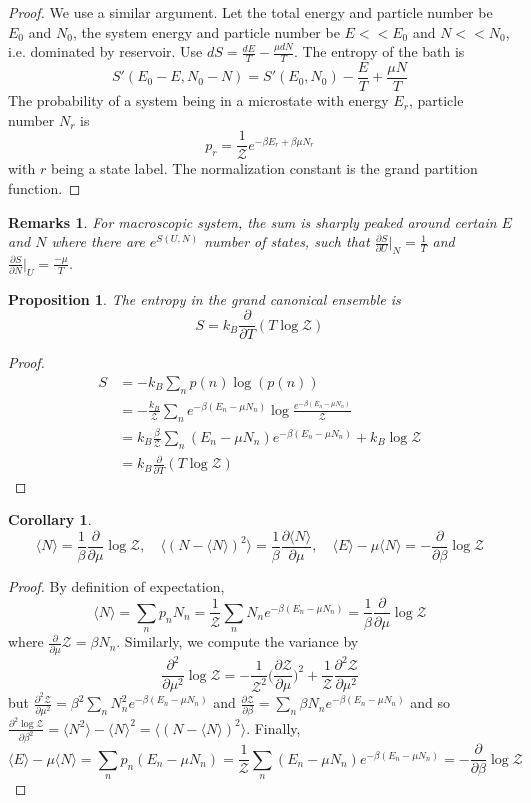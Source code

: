 \documentclass[a4paper]{article}
\newtheorem{remarks}{Remarks}[section]
\theoremstyle{new}
\newtheorem{prop}{Proposition}[section]
\newtheorem{cor}{Corollary}[section]
\begin{document}
\begin{proof}
We use a similar argument. Let the total energy and particle number be $E_0$ and $N_0$, the system energy and particle number be $E<<E_0$ and $N<<N_0$, i.e. dominated by reservoir. Use $dS=\frac{dE}{T}-\frac{\mu dN}{T}$. The entropy of the bath is 
$$S'(E_0-E,N_0-N)=S'(E_0,N_0)-\frac{E}{T}+\frac{\mu N}{T}$$
The probability of a system being in a microstate with energy $E_r$, particle number $N_r$ is
$$p_r=\frac{1}{\mathcal{Z}}e^{-\beta E_r+\beta\mu N_r}$$
with $r$ being a state label. The normalization constant is the grand partition function.
\end{proof}
\begin{remarks}
For macroscopic system, the sum is sharply peaked around certain $E$ and $N$ where there are $e^{S(U,N)}$ number of states, such that $\frac{\partial S}{\partial U}|_N=\frac{1}{T}$ and $\frac{\partial S}{\partial N}|_U=\frac{-\mu}{T}$. 
\end{remarks}
\begin{prop}
The entropy in the grand canonical ensemble is
$$S=k_B\frac{\partial}{\partial T}(T\log\mathcal{Z})$$
\end{prop}
\begin{proof}
\begin{align}
S&=-k_B\sum_np(n)\log(p(n))\nonumber\\&=-\frac{k_B}{\mathcal{Z}}\sum_ne^{-\beta (E_n-\mu N_n)}\log\frac{e^{-\beta (E_n-\mu N_n)}}{\mathcal{Z}}\nonumber\\&=k_B\frac{\beta}{\mathcal{Z}}\sum_n(E_n-\mu N_n)e^{-\beta (E_n-\mu N_n)}+k_B\log\mathcal{Z}\nonumber\\&=k_B\frac{\partial}{\partial T}(T\log \mathcal{Z})\nonumber
\end{align}
\end{proof}
\begin{cor}
$$\langle N\rangle=\frac{1}{\beta}\frac{\partial}{\partial\mu}\log\mathcal{Z},\quad\langle (N-\langle N\rangle)^2\rangle=\frac{1}{\beta}\frac{\partial\langle N\rangle}{\partial\mu},\quad\langle E\rangle-\mu\langle N\rangle=-\frac{\partial}{\partial\beta}\log\mathcal{Z}$$
\end{cor}
\begin{proof}
By definition of expectation,
$$\langle N\rangle=\sum_np_nN_n=\frac{1}{\mathcal{Z}}\sum_nN_ne^{-\beta (E_n-\mu N_n)}=\frac{1}{\beta}\frac{\partial}{\partial\mu}\log\mathcal{Z}$$
where $\frac{\partial}{\partial\mu}\mathcal{Z}=\beta N_n$. Similarly, we compute the variance by
$$\frac{\partial^2}{\partial\mu^2}\log \mathcal{Z}=-\frac{1}{\mathcal{Z}^2}\bigg(\frac{\partial\mathcal{Z}}{\partial\mu}\bigg)^2+\frac{1}{\mathcal{Z}}\frac{\partial^2\mathcal{Z}}{\partial\mu^2}$$
but $\frac{\partial^2\mathcal{Z}}{\partial\mu^2}=\beta^2\sum_nN_n^2e^{-\beta (E_n-\mu N_n)}$ and $\frac{\partial \mathcal{Z}}{\partial\beta}=\sum_n\beta N_ne^{-\beta (E_n-\mu N_n)}$ and so $\frac{\partial^2\log \mathcal{Z}}{\partial\beta^2}=\langle N^2\rangle-\langle N\rangle^2=\langle (N-\langle N\rangle)^2\rangle$. Finally,
$$\langle E\rangle-\mu\langle N\rangle=\sum_np_n(E_n-\mu N_n)=\frac{1}{\mathcal{Z}}\sum_n(E_n-\mu N_n)e^{-\beta(E_n-\mu N_n)}=-\frac{\partial}{\partial\beta}\log\mathcal{Z}$$ 
\end{proof}
\end{document}
